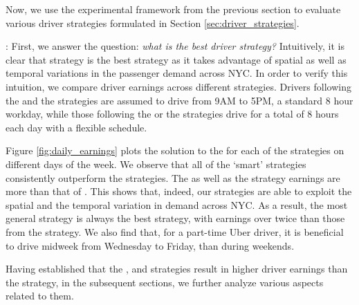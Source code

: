 Now, we use the experimental framework from the previous section to evaluate various driver strategies formulated in Section \ref{sec:driver_strategies}.

: First, we answer the question: \textit{what is the best driver strategy?} Intuitively, it is clear that {\relocationflexible} strategy is the best strategy as it takes advantage of spatial as well as temporal variations in the passenger demand across NYC. In order to verify this intuition, we compare driver earnings across different strategies. Drivers following the {\naive} and the {\relocation} strategies are assumed to drive from 9AM to 5PM, a standard 8 hour workday, while those following the {\flexible} or the {\relocationflexible} strategies drive for a total of 8 hours each day with a flexible schedule.

Figure \ref{fig:daily_earnings} plots the solution to the {\originalproblem} for each of the strategies on different days of the week. We observe that all of the `smart' strategies consistently outperform the {\naive} strategies. The {\relocation} as well as the {\flexible} strategy earnings are more than that of {\naive}. This shows that, indeed, our strategies are able to exploit the spatial and the temporal variation in demand across NYC. As a result, the most general {\relocationflexible} strategy is always the best strategy, with earnings over twice than those from the {\naive} strategy. We also find that, for a part-time Uber driver, it is beneficial to drive midweek from Wednesday to Friday, than during weekends.

Having established that the {\relocation}, {\flexible} and {\relocationflexible} strategies result in higher driver earnings than the {\naive} strategy, in the subsequent sections, we further analyze various aspects related to them.

